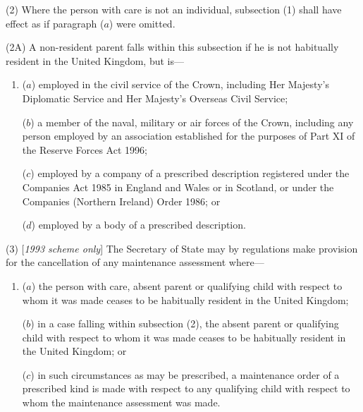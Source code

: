\documentclass[12pt,a4paper]{article}
\begin{document}
(2) Where the person with care is not an individual, subsection (1)  shall have effect as if paragraph ($a$)  were omitted.

(2A) A non-resident parent falls within this subsection if he is not habitually resident in the United Kingdom, but is—
\begin{enumerate}\item[]
($a$) employed in the civil service of the Crown, including Her Majesty’s Diplomatic Service and Her Majesty’s Overseas Civil Service;

($b$) a member of the naval, military or air forces of the Crown, including any person employed by an association established for the purposes of Part XI of the Reserve Forces Act 1996;

($c$) employed by a company of a prescribed description registered under the Companies Act 1985 in England and Wales or in Scotland, or under the Companies (Northern Ireland) Order 1986; or

($d$) employed by a body of a prescribed description.
\end{enumerate}

(3) [\emph{1993 scheme only}] The Secretary of State may by regulations make provision for the cancellation of any maintenance assessment where—
\begin{enumerate}\item[]
($a$) the person with care, absent parent or qualifying child with respect to whom it was made ceases to be habitually resident in the United Kingdom;

($b$) in a case falling within subsection (2), the absent parent or qualifying child with respect to whom it was made ceases to be habitually resident in the United Kingdom; or

($c$) in such circumstances as may be prescribed, a maintenance order of a prescribed kind is made with respect to any qualifying child with respect to whom the maintenance assessment was made.
\end{enumerate}

\end{document}
